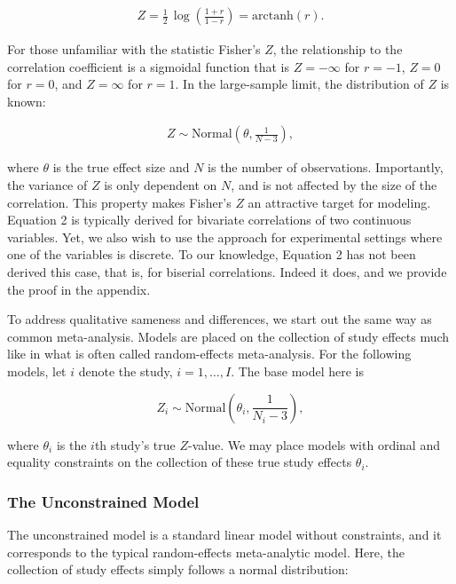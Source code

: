 \documentclass[english,,man]{apa6}
\begin{document}
\begin{align}\label{eq:Zcalc}
Z = \frac{1}{2} \, \log \left(\frac{1 + r}{1 - r}\right) = \mbox{arctanh}(r).
\end{align}

For those unfamiliar with the statistic Fisher's \(Z\), the relationship to the correlation coefficient is a sigmoidal function that is \(Z = -\infty\) for \(r = -1\), \(Z = 0\) for \(r = 0\), and \(Z = \infty\) for \(r = 1\). In the large-sample limit, the distribution of \(Z\) is known:

\begin{align}\label{eq:fishersZ}
Z \sim \mbox{Normal} \left(\theta, \frac{1}{N - 3}\right),
\end{align}

where \(\theta\) is the true effect size and \(N\) is the number of observations. Importantly, the variance of \(Z\) is only dependent on \(N\), and is not affected by the size of the correlation. This property makes Fisher's \(Z\) an attractive target for modeling. Equation 2 is typically derived for bivariate correlations of two continuous variables. Yet, we also wish to use the approach for experimental settings where one of the variables is discrete. To our knowledge, Equation 2 has not been derived this case, that is, for biserial correlations. Indeed it does, and we provide the proof in the appendix.

To address qualitative sameness and differences, we start out the same way as common meta-analysis. Models are placed on the collection of study effects much like in what is often called random-effects meta-analysis. For the following models, let \(i\) denote the study, \(i = 1, \ldots, I\). The base model here is

\begin{equation}\label{eq:basemodel}
Z_i \sim \mbox{Normal} \left(\theta_i, \frac{1}{N_i - 3}\right),
\end{equation}

where \(\theta_i\) is the \(i\)th study's true \(Z\)-value. We may place models with ordinal and equality constraints on the collection of these true study effects \(\theta_i\).

\hypertarget{the-unconstrained-model}{%
\subsubsection{The Unconstrained Model}\label{the-unconstrained-model}}

The unconstrained model is a standard linear model without constraints, and it corresponds to the typical random-effects meta-analytic model. Here, the collection of study effects simply follows a normal distribution:
\end{document}
